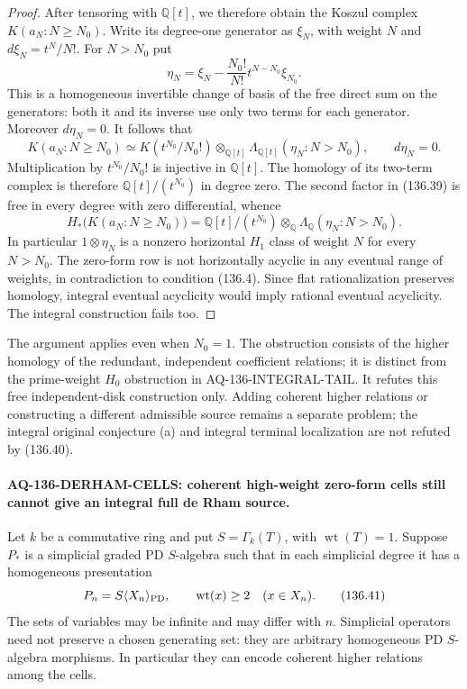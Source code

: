 \documentclass[11pt,a4paper]{article}
\theoremstyle{definition}\newtheorem{definition}[theorem]{Definition}
\theoremstyle{remark}\newtheorem{remark}[theorem]{Remark}
\begin{document}
\begin{proof}
After tensoring with $\mathbb Q[t]$, we therefore
obtain the Koszul complex $K(a_N:N\geq N_0)$.
Write its degree-one generator as $\xi_N$, with
weight $N$ and $d\xi_N=t^N/N!$.  For $N>N_0$ put
\[
 \eta_N=\xi_N-
              \frac{N_0!}{N!}t^{N-N_0}\xi_{N_0}.
                                                               \tag{136.38}
\]
This is a homogeneous invertible change of basis
of the free direct sum on the generators: both
it and its inverse use only two terms for each
generator.  Moreover $d\eta_N=0$.  It follows that
\[
 K(a_N:N\geq N_0)
  \simeq K(t^{N_0}/N_0!)\otimes_{\mathbb Q[t]}
                 \Lambda_{\mathbb Q[t]}(\eta_N:N>N_0),
                  \qquad d\eta_N=0.                       \tag{136.39}
\]
Multiplication by $t^{N_0}/N_0!$ is injective in
$\mathbb Q[t]$.  The homology of its two-term complex
is therefore $\mathbb Q[t]/(t^{N_0})$ in degree zero.
The second factor in (136.39) is free in every
degree with zero differential, whence
\[
 H_*\bigl(K(a_N:N\geq N_0)\bigr)
  =\mathbb Q[t]/(t^{N_0})\otimes_{\mathbb Q}
                         \Lambda_{\mathbb Q}(\eta_N:N>N_0).
                                                               \tag{136.40}
\]
In particular $1\otimes\eta_N$ is a nonzero
horizontal $H_1$ class of weight $N$ for every
$N>N_0$.  The zero-form row is not horizontally
acyclic in any eventual range of weights, in
contradiction to condition (136.4).  Since flat
rationalization preserves homology, integral
eventual acyclicity would imply rational eventual
acyclicity.  The integral construction fails too.
\end{proof}

The argument applies even when $N_0=1$.  The
obstruction consists of the higher homology of
the redundant, independent coefficient relations;
it is distinct from the prime-weight $H_0$
obstruction in AQ-136-INTEGRAL-TAIL.  It refutes
this free independent-disk construction only.
Adding coherent higher relations or constructing
a different admissible source remains a separate
problem; the integral original conjecture (a)
and integral terminal localization are not
refuted by (136.40).


\paragraph{AQ-136-DERHAM-CELLS: coherent high-weight zero-form cells still cannot give an integral full de Rham source.}
Let $k$ be a commutative ring and put $S=\Gamma_k(T)$,
with $\operatorname{wt}(T)=1$.  Suppose $P_*$ is a
simplicial graded PD $S$-algebra such that in each
simplicial degree it has a homogeneous presentation
\[
                  P_n=S\langle X_n\rangle_{\rm PD},
           \qquad \operatorname{wt}(x)\geq2
                      \quad(x\in X_n).                    \tag{136.41}
\]
The sets of variables may be infinite and may differ
with $n$.  Simplicial operators need not preserve a
chosen generating set: they are arbitrary homogeneous
PD $S$-algebra morphisms.  In particular they can encode
coherent higher relations among the cells.
\end{document}
